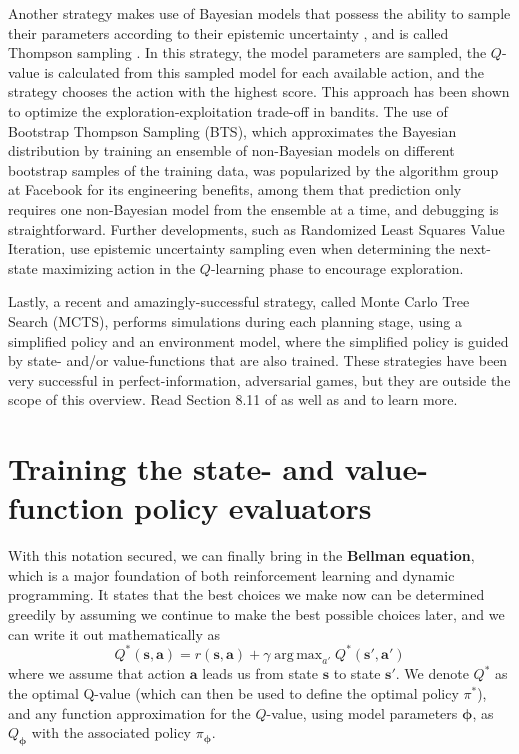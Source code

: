 \documentclass{article}
\DeclareMathOperator*{\argmax}{arg\,max}
\begin{document}
Another strategy makes use of Bayesian models that possess the ability to sample their parameters according to their epistemic uncertainty \cite{GP_BLR}, and is called Thompson sampling \cite{thompson_sampling}. In this strategy, the model parameters are sampled, the $Q$-value is calculated from this sampled model for each available action, and the strategy chooses the action with the highest score. This approach has been shown to optimize the exploration-exploitation trade-off in bandits\cite{thompson_sampling,bootstrap_DQN}. The use of Bootstrap Thompson Sampling (BTS), which approximates the Bayesian distribution by training an ensemble of non-Bayesian models on different bootstrap samples of the training data, was popularized by the algorithm group at Facebook for its engineering benefits, among them that prediction only requires one non-Bayesian model from the ensemble at a time, and debugging is straightforward\cite{bootstrap_facebook}. Further developments, such as Randomized Least Squares Value Iteration, use epistemic uncertainty sampling even when determining the next-state maximizing action in the $Q$-learning phase\cite{RLSVI} to encourage exploration.

Lastly, a recent and amazingly-successful strategy, called Monte Carlo Tree Search (MCTS), performs simulations during each planning stage, using a simplified policy and an environment model, where the simplified policy is guided by state- and/or value-functions that are also trained. These strategies have been very successful in perfect-information, adversarial games, but they are outside the scope of this overview. Read Section 8.11 of \cite{sutton_barto_rl} as well as \cite{go1} and \cite{go2} to learn more.

\section{Training the state- and value-function policy evaluators\label{sec:value_training}}

With this notation secured, we can finally bring in the \textbf{Bellman equation}, which is a major foundation of both reinforcement learning and dynamic programming. It states that the best choices we make now can be determined greedily by assuming we continue to make the best possible choices later, and we can write it out mathematically as
\begin{equation}\label{eq:bellman}
Q^\ast(\mathbf{s},\mathbf{a})=r(\mathbf{s},\mathbf{a})+\gamma \argmax_{a'}Q^\ast(\mathbf{s}',\mathbf{a}')
\end{equation}where we assume that action $\mathbf{a}$ leads us from state $\mathbf{s}$ to state $\mathbf{s}'$. We denote $Q^\ast$ as the optimal Q-value (which can then be used to define the optimal policy $\pi^\ast$), and any function approximation for the $Q$-value, using model parameters $\boldsymbol{\phi}$, as $Q_{\boldsymbol{\phi}}$ with the associated policy $\pi_{\boldsymbol{\phi}}$.
\end{document}
